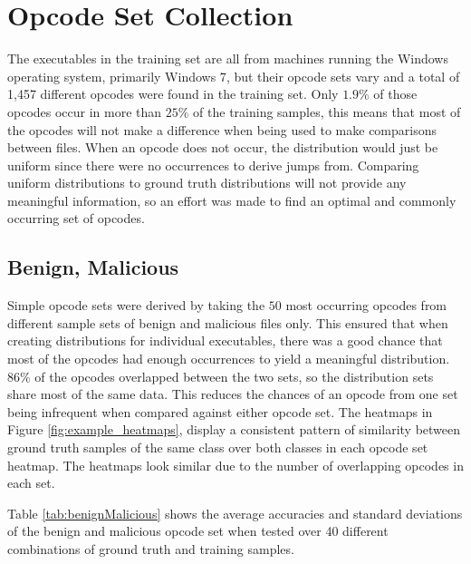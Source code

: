 
\section{Opcode Set Collection}

The executables in the training set are all from machines running the Windows operating system,
primarily Windows 7\cite{lester}, but their opcode sets vary and a total of 1,457 different opcodes
were found in the training set.
Only $1.9\%$ of those opcodes occur in more than $25\%$ of the training samples, this means that most of the opcodes
will not make a difference when being used to make comparisons between files.
When an opcode does not occur, the distribution would just be uniform since there were no occurrences to
derive jumps from.
Comparing uniform distributions to ground truth distributions will not provide any meaningful information, so an effort
was made to find an optimal and commonly occurring set of opcodes.

\subsection{Benign, Malicious}

Simple opcode sets were derived by taking the $50$ most occurring opcodes from different sample sets of benign and
malicious files only.
This ensured that when creating distributions for individual executables, there was a good chance that most
of the opcodes had enough occurrences to yield a meaningful distribution.
$86\%$ of the opcodes overlapped between the two sets, so the distribution sets share most of the same data.
This reduces the chances of an opcode from one set being infrequent when compared against either opcode set.
The heatmaps in Figure \ref{fig:example_heatmaps}, display a consistent pattern of similarity between
ground truth samples of the same class over both classes in each opcode set heatmap.
The heatmaps look similar due to the number of overlapping opcodes in each set.

Table \ref{tab:benignMalicious} shows the average accuracies and standard deviations of the benign and malicious opcode
set when tested over 40 different combinations of ground truth and training samples.

